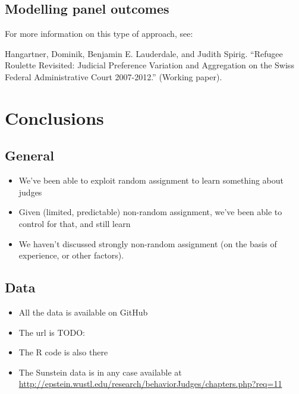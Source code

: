 \documentclass[12pt,twoside]{article}
\providecommand{\tightlist}{%
  \setlength{\itemsep}{0pt}\setlength{\parskip}{0pt}}
\begin{document}
\subsection{Modelling panel outcomes}\label{modelling-panel-outcomes}

For more information on this type of approach, see:

Hangartner, Dominik, Benjamin E. Lauderdale, and Judith Spirig.
``Refugee Roulette Revisited: Judicial Preference Variation and
Aggregation on the Swiss Federal Administrative Court 2007-2012.''
(Working paper).

\section{Conclusions}\label{conclusions}

\subsection{General}\label{general}

\begin{itemize}
\tightlist
\item
  We've been able to exploit random assignment to learn something about
  judges
\item
  Given (limited, predictable) non-random assignment, we've been able to
  control for that, and still learn
\item
  We haven't discussed strongly non-random assignment (on the basis of
  experience, or other factors).
\end{itemize}

\subsection{Data}\label{data}

\begin{itemize}
\tightlist
\item
  All the data is available on GitHub
\item
  The url is TODO:
\item
  The R code is also there
\item
  The Sunstein data is in any case available at
  \url{http://epstein.wustl.edu/research/behaviorJudges/chapters.php?req=11}
\end{itemize}

\hypertarget{refs}{}
\end{document}
